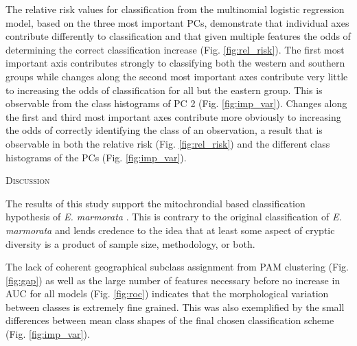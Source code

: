 \documentclass[12pt,letterpaper]{article}\usepackage{graphicx, color}
\renewcommand{\section}[1]{%
\bigskip
\begin{center}
\begin{Large}
\normalfont\scshape #1
\medskip
\end{Large}
\end{center}}
\begin{document}
The relative risk values for classification from the multinomial logistic regression model, based on the three most important PCs, demonstrate that individual axes contribute differently to classification and that given multiple features the odds of determining the correct classification increase (Fig. \ref{fig:rel_risk}). The first most important axis contributes strongly to classifying both the western and southern groups while changes along the second most important axes contribute very little to increasing the odds of classification for all but the eastern group. This is observable from the class histograms of PC 2 (Fig. \ref{fig:imp_var}). Changes along the first and third most important axes contribute more obviously to increasing the odds of correctly identifying the class of an observation, a result that is observable in both the relative risk (Fig. \ref{fig:rel_risk}) and the different class histograms of the PCs (Fig. \ref{fig:imp_var}).

\section{Discussion}
The results of this study support the mitochrondial based classification hypothesis of \textit{E. marmorata} \citep{Spinks2005,Spinks2010}. This is contrary to the original classification of \textit{E. marmorata} \citep{Seeliger1945,Holland1992} and lends credence to the idea that at least some aspect of cryptic diversity is a product of sample size, methodology, or both.


The lack of coherent geographical subclass assignment from PAM clustering (Fig. \ref{fig:gap}) as well as the large number of features necessary before no increase in AUC for all models (Fig. \ref{fig:roc}) indicates that the morphological variation between classes is extremely fine grained. This was also exemplified by the small differences between mean class shapes of the final chosen classification scheme (Fig. \ref{fig:imp_var}).
\end{document}
